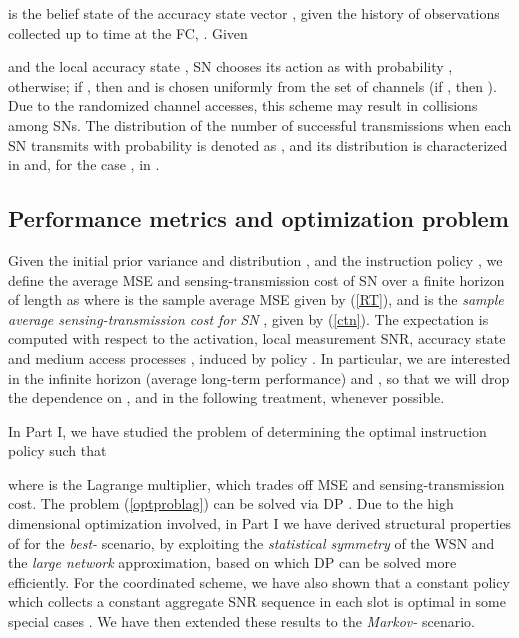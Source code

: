 \documentclass[10pt,twocolumn,twoside]{IEEEtran}
\theoremstyle{plain}
\begin{document}
is the belief state of the accuracy state vector , given the history of observations collected up to time  at the FC, . 
Given 

and the local accuracy state ,
 SN  chooses its action 
as  with probability ,
 otherwise; if , then
 and  is chosen uniformly from the set of  channels 
(if , then ).
Due to the randomized channel accesses, this scheme may result in collisions among SNs.
The distribution of the number of successful transmissions when each SN transmits with probability  is denoted as
, and its distribution is characterized in \cite[Prop.~4]{MichelusiP1} and, for the case , in \cite[Corollary 1]{MichelusiP1}.

\vspace{-3mm}
\subsection{Performance metrics and optimization problem}
\label{sec:optprob}
\noindent Given the initial prior variance and distribution  , and the instruction policy ,
we define the average MSE and sensing-transmission cost of SN   over a finite horizon of length 
as 
where  is the sample average MSE given by (\ref{RT}),
and 
is the \emph{sample average sensing-transmission cost for SN }, given by (\ref{ctn}).
The expectation is computed with respect to the activation, local measurement SNR, accuracy state and medium access processes 
, induced by policy .
 In particular, we are interested in the infinite horizon   (average long-term performance)
 and ,
 so that we will drop the dependence  on ,  and  in the following treatment, whenever possible.


In Part I,
we have studied the problem of determining the optimal instruction policy  such that

where  is the Lagrange multiplier, which trades off MSE and sensing-transmission cost.
The problem (\ref{optproblag}) can be solved
via DP \cite{Bertsekas2005}.
Due to the high dimensional optimization involved, in Part I
we have derived structural properties of  for the
\emph{best-} scenario, by exploiting the \emph{statistical symmetry} of the WSN and the \emph{large network} approximation,
based on which DP can be solved more efficiently. For the coordinated scheme, we have also
shown that a constant policy which collects a constant aggregate SNR sequence  in each slot is optimal
in some special cases \cite[Theorem 2]{MichelusiP1}. We have then extended these results to the \emph{Markov-} scenario.
\end{document}
